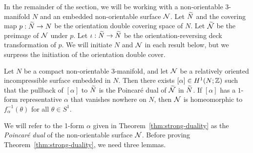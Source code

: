 In the remainder of the section, we will be working with a non-orientable 3-manifold $N$ and an embedded non-orientable surface $\mathcal{N}$.   Let $\widetilde{N}$ and the covering map $p:\widetilde{N}\rightarrow N$ be the orientation double covering space of $N$.  Let $\widetilde{\mathcal{N}}$ be the preimage of $\mathcal{N}$ under $p$.  Let $\iota:\widetilde{N}\rightarrow\widetilde{N}$ be the orientation-reversing deck transformation of $p$.  We will initiate $N$ and $\mathcal{N}$ in each result below, but we surpress the initiation of the orientation double cover.

\begin{thm}
  \label{thm:strong-duality}
  Let $N$ be a compact non-orientable $3$-manifold, and let $\mathcal{N}$ be a relatively oriented incompressible surface embedded in $N$.
  Then there exists $[\alpha] \in H^1(N; \mathbb{Z})$ such that the pullback of $[\alpha]$ to $\widetilde{N}$ is the Poincar\'e dual of $\widetilde{\mathcal{N}}$ in $\widetilde{N}$.
  If $[\alpha]$ has a $1$-form representative $\alpha$ that vanishes nowhere on $N$, then $\mathcal{N}$ is homeomorphic to $f_{\alpha}^{-1}(\theta)$ for all $\theta \in S^1$.
\end{thm}

We will refer to the 1-form $\alpha$ given in Theorem~\ref{thm:strong-duality} as the {\it Poincar\'e dual} of the non-orientable surface $\mathcal{N}$.  Before proving Theorem~\ref{thm:strong-duality}, we need three lemmas.


